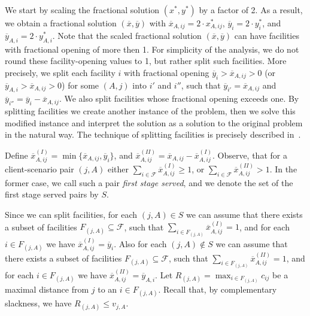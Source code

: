 \documentclass[11pt]{article}
\newcommand{\F}{\mathcal{F}}
\begin{document}
We start by scaling the fractional solution $(x^*,y^*)$ by a factor of 2.
As a result, we obtain a fractional solution $(\overline{x},\overline{y})$
with $\overline{x}_{A,ij} = 2 \cdot x^*_{A,ij} $, $\overline{y}_i =  2 \cdot y^*_i $,
and $\overline{y}_{A,i} =  2 \cdot y^*_{A,i} $. Note that the scaled fractional solution
$(\overline{x},\overline{y})$ can have facilities with fractional opening of more then 1.
For simplicity of the analysis, we do not round these facility-opening values to 1, but rather split such facilities.
More precisely, we split each facility $i$ with fractional opening $\overline{y}_i > \overline{x}_{A,ij} > 0$ (or $\overline{y}_{A,i} > \overline{x}_{A,ij} > 0$) for some $(A, j)$ into $i'$ and $i''$, such that 
 $\overline{y}_{i'} = \overline{x}_{A,ij}$ and $\overline{y}_{i''} = \overline{y}_i - \overline{x}_{A,ij}$.
We also split facilities whose fractional opening exceeds one.
By splitting facilities we create another instance of the problem, then we solve this modified instance
and interpret the solution as a solution to the original problem in the natural way.
The technique of splitting facilities is precisely described in~\cite{DBLP:conf/ipco/Sviridenko02}.

Define $\overline{x}^{(I)}_{A,ij} = \min \{\overline{x}_{A,ij}, \overline{y}_i \}$, and 
$\overline{x}^{(II)}_{A,ij} = \overline{x}_{A,ij} - \overline{x}^{(I)}_{A,ij}$.
Observe, that for a client-scenario pair $(j,A)$ either $\sum_{i \in \F} \overline{x}^{(I)}_{A,ij} \geq 1$, or
$\sum_{i \in \F} \overline{x}^{(II)}_{A,ij} > 1$. In the former case, we call such a pair \emph{first stage served},
and we denote the set of the first stage served pairs by $S$.

Since we can split facilities, for each $(j,A) \in S$ we can assume that
there exists a subset of facilities $F_{(j,A)} \subseteq \F$, 
such that $\sum_{i \in  F_{(j,A)} } \overline{x}^{(I)}_{A,ij} = 1$,
and for each $i \in F_{(j,A)}$ we have $\overline{x}^{(I)}_{A,ij} = \overline{y}_i$.
Also for each $(j,A) \notin S$ we can assume that
there exists a subset of facilities $F_{(j,A)} \subseteq \F$,
such that $\sum_{i \in  F_{(j,A)} } \overline{x}^{(II)}_{A,ij} = 1$,
and for each $i \in F_{(j,A)}$ we have $\overline{x}^{(II)}_{A,ij} = \overline{y}_{A,i}$.
Let $R_{(j,A)} = \max_{i \in F_{(j,A)}} c_{ij}$ be a maximal distance from $j$ to an $i \in F_{(j,A)}$.
Recall that, by complementary slackness, we have $R_{(j,A)} \leq v_{j,A}$. 
\end{document}
